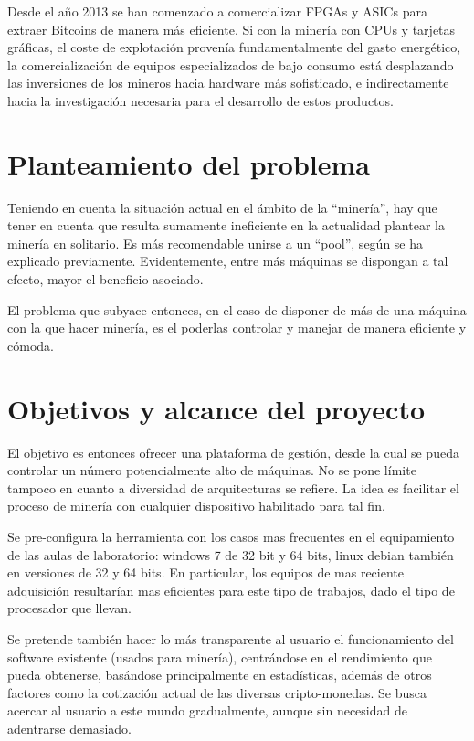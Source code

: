 Desde el a\~no 2013 se han comenzado a comercializar FPGAs y ASICs para extraer Bitcoins de manera m\'as eficiente. Si con la miner\'ia con CPUs y tarjetas gr\'aficas, el coste de explotaci\'on proven\'ia fundamentalmente del gasto energ\'etico, la comercializaci\'on de equipos especializados de bajo consumo est\'a desplazando las inversiones de los mineros hacia hardware m\'as sofisticado, e indirectamente hacia la investigaci\'on necesaria para el desarrollo de estos productos.


\section{Planteamiento del problema}

Teniendo en cuenta la situaci\'on actual en el \'ambito de la ``miner\'ia'', hay que tener en cuenta que resulta sumamente ineficiente en la actualidad plantear la miner\'ia en solitario. Es m\'as recomendable unirse a un ``pool'', seg\'un se ha explicado previamente. Evidentemente, entre m\'as m\'aquinas se dispongan a tal efecto, mayor el beneficio asociado.

El problema que subyace entonces, en el caso de disponer de m\'as de una m\'aquina con la que hacer miner\'ia, es el poderlas controlar y manejar de manera eficiente y c\'omoda.

\section{Objetivos y alcance del proyecto}

El objetivo es entonces ofrecer una plataforma de gesti\'on, desde la cual se pueda controlar un n\'umero potencialmente alto de m\'aquinas. No se pone l\'imite tampoco en cuanto a diversidad de arquitecturas se refiere. La idea es facilitar el proceso de miner\'ia con cualquier dispositivo habilitado para tal fin.

Se pre-configura la herramienta con los casos mas frecuentes en el equipamiento de las aulas de laboratorio: windows 7 de 32 bit y 64 bits, linux debian tambi\'en en versiones de 32 y 64 bits. En particular, los equipos de mas reciente adquisici\'on resultar\'ian mas eficientes para este tipo de trabajos, dado el tipo de procesador que llevan.

Se pretende tambi\'en hacer lo m\'as transparente al usuario el funcionamiento del software existente (usados para miner\'ia), centr\'andose en el rendimiento que pueda obtenerse, bas\'andose principalmente en estad\'isticas, adem\'as de otros factores como la cotizaci\'on actual de las diversas cripto-monedas. Se busca acercar al usuario a este mundo gradualmente, aunque sin necesidad de adentrarse demasiado.


